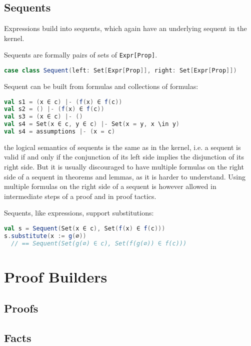 \subsection{Sequents}

Expressions build into sequents, which again have an underlying sequent in the kernel.


\begin{definition}[Sequents]
  Sequents are formally pairs of sets of \lstinline|Expr[Prop]|.
  \begin{lstlisting}[language=scala]
case class Sequent(left: Set[Expr[Prop]], right: Set[Expr[Prop]])
  \end{lstlisting}
  \noindent
  Sequent can be built from formulas and collections of formulas:
  \begin{lstlisting}[language=scala]
val s1 = (x ∈ c) |- (f(x) ∈ f(c))
val s2 = () |- (f(x) ∈ f(c))
val s3 = (x ∈ c) |- ()
val s4 = Set(x ∈ c, y ∈ c) |- Set(x = y, x \in y)
val s4 = assumptions |- (x = c)
  \end{lstlisting}
  the logical semantics of sequents is the same as in the kernel, i.e. a sequent is valid if and only if the conjunction of its left side implies the disjunction of its right side.
  But it is usually discouraged to have multiple formulas on the right side of a sequent in theorems and lemmas, as it is harder to understand. Using multiple formulas on the right side of a sequent is however allowed in intermediate steps of a proof and in proof tactics.

  Sequents, like expressions, support substitutions:
  \begin{lstlisting}[language=scala]
val s = Sequent(Set(x ∈ c), Set(f(x) ∈ f(c)))
s.substitute(x := g(∅)) 
  // == Sequent(Set(g(∅) ∈ c), Set(f(g(∅)) ∈ f(c)))
  \end{lstlisting}
\end{definition}

\section{Proof Builders}

\subsection{Proofs}

\subsection{Facts}

